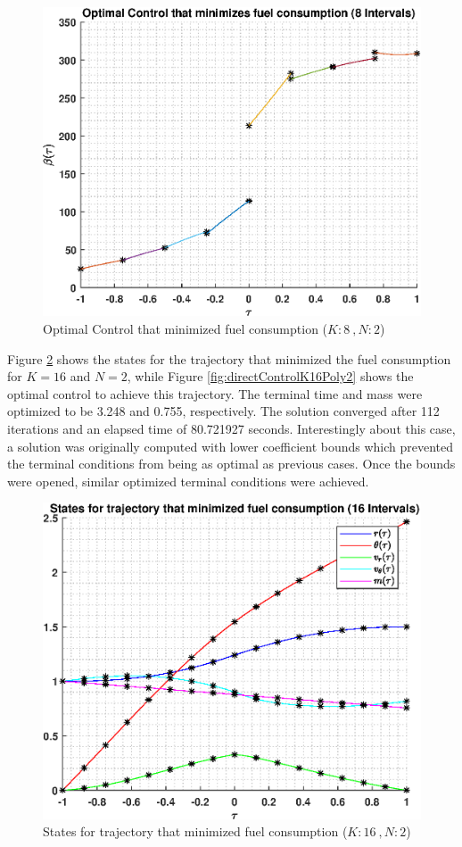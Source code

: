 \documentclass[]{article}
\begin{document}
\begin{figure}
	\centering
	\includegraphics[scale=0.75]{directControlK8Poly2.eps}
	\caption{Optimal Control that minimized fuel consumption (\(K:8\ , N:2\))}
	\label{fig:directControlK8Poly2}
\end{figure}
Figure \ref{fig:directStatesK16Poly2} shows the states for the trajectory that minimized the fuel consumption for \(K = 16\) and  \(N = 2\), while Figure \ref{fig:directControlK16Poly2} shows the optimal control to achieve this trajectory. The terminal time and mass were optimized to be 3.248 and 0.755, respectively. The solution converged after 112 iterations and an elapsed time of 80.721927 seconds. Interestingly about this case, a solution was originally computed with lower coefficient bounds which prevented the terminal conditions from being as optimal as previous cases. Once the bounds were opened, similar optimized terminal conditions were achieved.
\begin{figure}
	\centering
	\includegraphics[scale=0.75]{directStatesK16Poly2.eps}
	\caption{States for trajectory that minimized fuel consumption (\(K:16\ , N:2\))}
	\label{fig:directStatesK16Poly2}
\end{figure}
\end{document}
